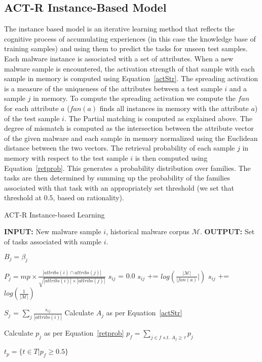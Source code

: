 \documentclass[conference]{IEEEtran}
\def\Pr{p}
\def\M{\mathcal{M}}
\def\attrib{\textit{attribs}}
\begin{document}
\subsection{ACT-R Instance-Based Model}
The instance based model is an iterative learning method that reflects the cognitive process of accumulating experiences (in this case the knowledge base of training samples) and using them to predict the tasks for unseen test samples. Each malware instance is associated with a set of attributes. When a new malware sample is encountered, the activation strength of that sample with each sample in memory is computed using Equation~\ref{actStr}. The spreading activation is a measure of the uniqueness of the attributes between a test sample $i$ and a sample $j$ in memory. To compute the spreading activation we compute the $fan$ for each attribute $a$ ($fan(a)$ finds all instances in memory with the attribute $a$) of the test sample $i$.  The Partial matching is computed as explained above.  The degree of mismatch is computed as the intersection between the attribute vector of the given malware and each sample in memory normalized using the Euclidean distance between the two vectors. The retrieval probability of each sample $j$ in memory with respect to the test sample $i$ is then computed using Equation~\ref{retprob}.  This generates a probability distribution over families.  The tasks are then determined by summing up the probability of the families associated with that task with an appropriately set threshold (we set that threshold at $0.5$, based on rationality).

\begin{algorithm}[]
	\caption{ACT-R Instance-based Learning}
	\begin{algorithmic}
		
		
		\STATE \textbf {INPUT:} New malware sample $i$, historical malware corpus $\M$.
		\STATE \textbf {OUTPUT:} Set of tasks associated with sample $i$.
		
		
		\FORALL {$j$ in $\M$} 
		
		\STATE $B_j = \beta_j$
		
		\STATE $P_j = mp \times \frac{|\attrib(i)\cap\attrib(j)|}{\sqrt{|\attrib(i)| \times |\attrib(j)|}}$
		\STATE $s_{ij}$ = 0.0
		\FOR {$a \in \attrib(i)$}		
		\IF {$a \in \attrib(j)$}
		\STATE $s_{ij}$ += $log(\frac{|\M|}{|fan(a)}|)$ 
		\ELSE
		\STATE $s_{ij}$ += $log(\frac{1}{|\M|})$
		\ENDIF
		\ENDFOR
		
		
		\STATE $S_j$ = $\sum_j\frac{s_{ij}}{|\attrib(i)|}$
		\STATE Calculate $A_j$ as per Equation~\ref{actStr}
	
		\ENDFOR
		
		\STATE Calculate $\Pr_j$ as per Equation~\ref{retprob}
		\STATE $\Pr_f = \sum_{j \in f \textit{ s.t. } A_j \geq \tau} \Pr_j$
		
		
		\STATE $t_p = \{t \in T | \Pr_f\geq0.5\}$
		\ENDFOR
		
	\end{algorithmic}
	
\end{algorithm}
\end{document}
